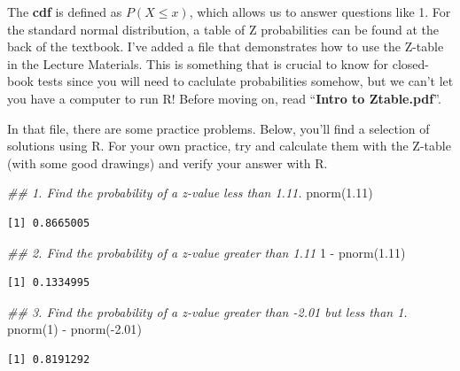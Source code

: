 \documentclass[
  letterpaper,
  DIV=11,
  numbers=noendperiod,
  oneside]{scrreprt}
\newenvironment{Shaded}{\begin{snugshade}}{\end{snugshade}}
\newcommand{\DecValTok}[1]{\textcolor[rgb]{0.68,0.00,0.00}{#1}}
\newcommand{\DocumentationTok}[1]{\textcolor[rgb]{0.37,0.37,0.37}{\textit{#1}}}
\newcommand{\FloatTok}[1]{\textcolor[rgb]{0.68,0.00,0.00}{#1}}
\newcommand{\FunctionTok}[1]{\textcolor[rgb]{0.28,0.35,0.67}{#1}}
\newcommand{\NormalTok}[1]{\textcolor[rgb]{0.00,0.23,0.31}{#1}}
\newcommand{\SpecialCharTok}[1]{\textcolor[rgb]{0.37,0.37,0.37}{#1}}
\begin{document}
The \textbf{cdf} is defined as \(P(X\le x)\), which allows us to answer
questions like 1. For the standard normal distribution, a table of Z
probabilities can be found at the back of the textbook. I've added a
file that demonstrates how to use the Z-table in the Lecture Materials.
This is something that is crucial to know for closed-book tests since
you will need to caclulate probabilities somehow, but we can't let you
have a computer to run R! Before moving on, read ``\textbf{Intro to
Ztable.pdf}''.

In that file, there are some practice problems. Below, you'll find a
selection of solutions using R. For your own practice, try and calculate
them with the Z-table (with some good drawings) and verify your answer
with R.

\begin{Shaded}
\begin{Highlighting}[]
\DocumentationTok{\#\# 1. Find the probability of a z{-}value less than 1.11.}
\FunctionTok{pnorm}\NormalTok{(}\FloatTok{1.11}\NormalTok{)}
\end{Highlighting}
\end{Shaded}

\begin{verbatim}
[1] 0.8665005
\end{verbatim}

\begin{Shaded}
\begin{Highlighting}[]
\DocumentationTok{\#\# 2. Find the probability of a z{-}value greater than 1.11}
\DecValTok{1} \SpecialCharTok{{-}} \FunctionTok{pnorm}\NormalTok{(}\FloatTok{1.11}\NormalTok{)}
\end{Highlighting}
\end{Shaded}

\begin{verbatim}
[1] 0.1334995
\end{verbatim}

\begin{Shaded}
\begin{Highlighting}[]
\DocumentationTok{\#\# 3. Find the probability of a z{-}value greater than {-}2.01 but less than 1.}
\FunctionTok{pnorm}\NormalTok{(}\DecValTok{1}\NormalTok{) }\SpecialCharTok{{-}} \FunctionTok{pnorm}\NormalTok{(}\SpecialCharTok{{-}}\FloatTok{2.01}\NormalTok{)}
\end{Highlighting}
\end{Shaded}

\begin{verbatim}
[1] 0.8191292
\end{verbatim}
\end{document}

